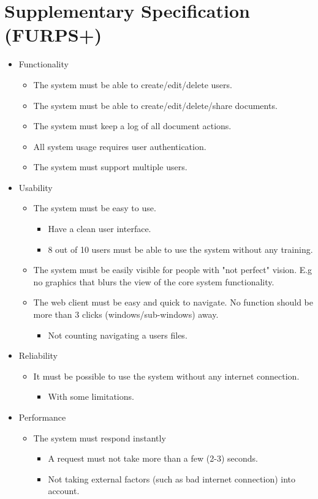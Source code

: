 \documentclass[11pt,a4paper]{article}
\begin{document}
\section{Supplementary Specification (FURPS+)}
\begin{itemize}
\item Functionality
	\begin{itemize}
	\item The system must be able to create/edit/delete users.
    \item The system must be able to create/edit/delete/share documents.
    \item The system must keep a log of all document actions.
    \item All system usage requires user authentication.
	\item The system must support multiple users.
	\end{itemize}
\item Usability
	\begin{itemize}
    \item The system must be easy to use.
    \begin{itemize}
	\item Have a clean user interface.
    \item 8 out of 10 users must be able to use the system without any training.    
    \end{itemize}
    \item The system must be easily visible for people with "not perfect" vision. 
     E.g no graphics that blurs the view of the core system functionality.
    \item The web client must be easy and quick to navigate. No function should 
     be more than 3 clicks (windows/sub-windows) away.
     \begin{itemize}
     \item Not counting navigating a users files.     
     \end{itemize}
	\end{itemize}
\item Reliability
	\begin{itemize}
	\item It must be possible to use the system without any internet connection.
	\begin{itemize}
	\item With some limitations.
	\end{itemize}
	\end{itemize}
\item Performance
	\begin{itemize}
    \item The system must respond instantly
    \begin{itemize}
	 \item A request must not take more than a few (2-3) seconds.
     \item Not taking external factors (such as bad internet connection) into account.    
    \end{itemize}
	\end{itemize}
\end{itemize}
\end{document}
